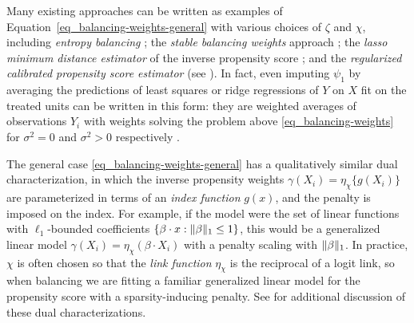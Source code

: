 \documentclass{article}
\DeclarePairedDelimiter\norm{\lVert}{\rVert}
\theoremstyle{definition}
\newcommand{\dispersion}{\chi}
\newcommand{\imbalancescale}{\zeta}
\newcommand{\<}{\langle}
\renewcommand{\>}{\rangle}
\begin{document}
Many existing approaches can be written as examples of Equation~\ref{eq_balancing-weights-general} with various
choices of $\imbalancescale$ and $\dispersion$, including
\emph{entropy balancing} \citep{hainmueller2012balancing}; the \emph{stable balancing weights} approach \citep{zubizarreta2015stable};
the \emph{lasso minimum distance estimator} of the inverse propensity score \citep{chernozhukov2018automatic};
and the \emph{regularized calibrated propensity score estimator} \citep{tan2020regularized} (see \cite{wang2020minimal}).
In fact, even imputing $\psi_1$ by averaging the predictions of least squares or ridge regressions  of $Y$ on $X$ fit on the treated units can be written in this form: they are weighted averages of observations $Y_i$ with
weights solving the problem above \eqref{eq_balancing-weights} for $\sigma^2=0$ and $\sigma^2 > 0$ respectively \citep{chattopadhyay2021implied, kallus2016generalized}.

The general case \eqref{eq_balancing-weights-general} has a qualitatively similar dual characterization, in which
the inverse propensity weights $\gamma(X_i) = \eta_{\dispersion}\{g(X_i)\}$
are parameterized in terms of an \emph{index function} $g(x)$, and the penalty is imposed on the index. For example, if the model were the set of linear functions with $\ell_1$-bounded coefficients $\{ \beta \cdot x : \norm{\beta}_1 \le 1\}$, this would be a generalized linear model $\gamma(X_i) = \eta_{\dispersion}(\beta \cdot X_i)$ with a penalty scaling with $\norm{\beta}_1$. In practice, $\dispersion$ is often chosen so that the \emph{link function} $\eta_{\dispersion}$ is the reciprocal of a logit link, so when balancing we are fitting a familiar generalized linear model for the propensity score with a sparsity-inducing penalty. See \citet{hirshberg2026bregman} for additional discussion of these dual characterizations.

\end{document}

